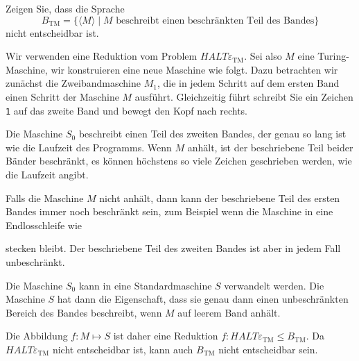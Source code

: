 Zeigen Sie, dass die Sprache
\[
B_{\text{TM}}
=
\{
\langle M\rangle
\mid
\text{$M$ beschreibt einen beschränkten Teil des Bandes}
\}
\]
nicht entscheidbar ist.

\begin{loesung}
Wir verwenden eine Reduktion vom Problem
$\textit{HALT}\varepsilon_{\text{TM}}$.
Sei also $M$ eine Turing-Maschine, wir konstruieren eine neue Maschine
wie folgt.
Dazu betrachten wir zunächst die Zweibandmaschine $M_1$, die in jedem 
Schritt auf dem ersten Band einen Schritt der Maschine $M$ ausführt.
Gleichzeitig führt schreibt Sie ein Zeichen \texttt{1} auf das zweite
Band und bewegt den Kopf nach rechts.

Die Maschine $S_0$ beschreibt einen Teil des zweiten Bandes, der
genau so lang ist wie die Laufzeit des Programms.
Wenn $M$ anhält, ist der beschriebene Teil beider Bänder beschränkt,
es können höchstens so viele Zeichen geschrieben werden, wie die Laufzeit
angibt.

Falls die Maschine $M$ nicht anhält, dann kann der beschriebene
Teil des ersten Bandes immer noch beschränkt sein, zum Beispiel
wenn die Maschine in eine Endlosschleife wie
\begin{center}
\def\h{0.4}
\def\zustand#1#2{
	\fill[color=white] #1 circle[radius=\h];
	\draw #1 circle[radius=\h];
	\node at #1 {$#2\mathstrut$};
}
\end{center}
stecken bleibt.
Der beschriebene Teil des zweiten Bandes ist aber in jedem Fall unbeschränkt.

Die Maschine $S_0$ kann in eine Standardmaschine $S$ verwandelt werden.
Die Maschine $S$ hat dann die Eigenschaft, dass sie genau dann einen
unbeschränkten Bereich des Bandes beschreibt, wenn $M$ auf leerem
Band anhält.

Die Abbildung $f\colon M\mapsto S$ ist daher eine Reduktion
$f \colon \textit{HALT}\varepsilon_{\text{TM}}\le B_{\text{TM}}$.
Da $\textit{HALT}\varepsilon_{\text{TM}}$ nicht entscheidbar ist,
kann auch $B_{\text{TM}}$ nicht entscheidbar sein.
\end{loesung}
